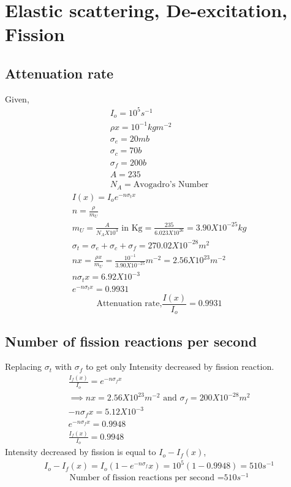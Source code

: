 \documentclass[11pt, a4paper]{article}
\begin{document}
\section{Elastic scattering, De-excitation, Fission}
\subsection*{Attenuation rate}
Given,
\begin{gather}
    I_o = 10^5 s^{-1} \\
    \rho x = 10^{-1} kgm^{-2} \\
    \sigma_e = 20 mb\\
    \sigma_c = 70 b\\
    \sigma_f = 200 b \\
    A = 235\\
    N_A = \text{Avogadro's Number}
\end{gather}
\begin{gather}
    I(x) = I_o e^{-n \sigma_t x}\\
    n = \frac{\rho}{m_U} \\
    m_U = \frac{A}{N_A X 10^3} \text{ in Kg} = \frac{235}{6.023 X10 ^26} = 3.90X10^{-25} kg\\
    \sigma_t = \sigma_e + \sigma_c + \sigma_f = 270.02 X 10^{-28} m^2 \\
    nx = \frac{\rho x}{m_U} = \frac{10^{-1} }{3.90X10^{-25}}m^{-2} = 2.56X10^{23} m^{-2}\\
    n\sigma_{t}x = 6.92X10^{-3}\\
    e^{-n\sigma_{t}x} =  0.9931 
\end{gather}
\begin{equation}
    \boxed{\text{Attenuation rate,}\frac{I(x)}{I_{o}} = 0.9931}
\end{equation}
\subsection*{Number of fission reactions per second}
Replacing \(\sigma_t\) with \(\sigma_f\) to get only Intensity decreased by fission reaction.
\begin{gather}
    \frac{I_f(x)}{I_{o} } = e^{-n\sigma_{f}x}\\
    \implies nx = 2.56X10^{23}m^{-2} \text{ and } \sigma_f = 200 X 10^{-28}m^2 \\
    -n\sigma_{f}x = 5.12X10^{-3} \\
    e^{-n\sigma_{f}x }  = 0.9948\\
    \frac{I_f(x)}{I_{o} }= 0.9948
\end{gather}
Intensity decreased by fission is equal to \(I_{o} -I_{f} (x)\),
\begin{gather}
    I_{o} -I_{f} (x) = I_{o} (1-e^{-n\sigma_f}x ) = 10^5(1-0.9948)=510 s^{-1} 
\end{gather}
\begin{equation}
    \boxed{\text{Number of fission reactions per second =}510s^{-1} }
\end{equation}
\end{document}
